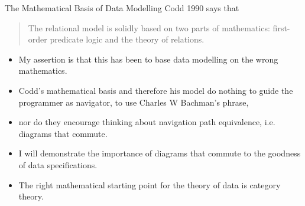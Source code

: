 \begin{frame}{The Mathematical Basis of Data Modelling}
Codd 1990 says that
\begin{quote}
The relational model is solidly based on two parts of mathematics: first-
order predicate logic and the theory of relations.
\end{quote} 

\medskip
\pause\begin{itemize}
\item My assertion is that this has been to base data modelling on the wrong mathematics. 
\item Codd's mathematical basis and therefore his  model  do nothing to guide the programmer as navigator, to use Charles W Bachman's phrase, 
\item nor do they encourage thinking about navigation path equivalence, i.e. diagrams that commute.
\item I will demonstrate the importance of diagrams that commute to the goodness of data specifications.
\item The right mathematical starting point for the theory of data is category theory.
\end{itemize}
\end{frame}


